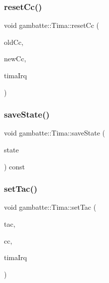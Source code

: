 \subsubsection{\texorpdfstring{reset\+Cc()}{resetCc()}}
{\footnotesize\ttfamily void gambatte\+::\+Tima\+::reset\+Cc (\begin{DoxyParamCaption}\item[{unsigned}]{old\+Cc,  }\item[{unsigned}]{new\+Cc,  }\item[{\hyperlink{classgambatte_1_1TimaInterruptRequester}{Tima\+Interrupt\+Requester}}]{tima\+Irq }\end{DoxyParamCaption})}

\mbox{\label{classgambatte_1_1Tima_a40d563556152c52bbd838d70895e4be4}} 
\subsubsection{\texorpdfstring{save\+State()}{saveState()}}
{\footnotesize\ttfamily void gambatte\+::\+Tima\+::save\+State (\begin{DoxyParamCaption}\item[{\hyperlink{structgambatte_1_1SaveState}{Save\+State} \&}]{state }\end{DoxyParamCaption}) const}

\mbox{\label{classgambatte_1_1Tima_a1e9e5f8cd0e04e5f73eafbf364bef772}} 
\subsubsection{\texorpdfstring{set\+Tac()}{setTac()}}
{\footnotesize\ttfamily void gambatte\+::\+Tima\+::set\+Tac (\begin{DoxyParamCaption}\item[{unsigned}]{tac,  }\item[{unsigned}]{cc,  }\item[{\hyperlink{classgambatte_1_1TimaInterruptRequester}{Tima\+Interrupt\+Requester}}]{tima\+Irq }\end{DoxyParamCaption})}

\mbox{\label{classgambatte_1_1Tima_a6b9a6fd1515acfb8d0b1315da7883e51}} 
